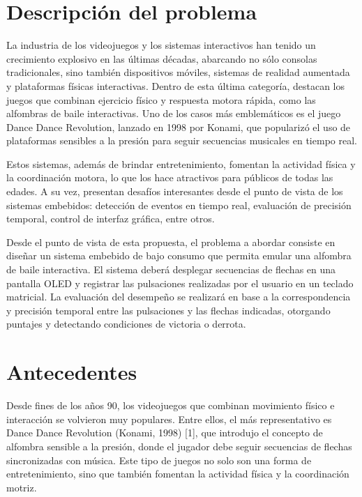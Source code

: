 \documentclass[a4paper,12pt]{article}
\begin{document}
\begin{linenumbers}
  \newpage
  \section{Descripción del problema}
  \label{sec:descripcion}
  La industria de los videojuegos y los sistemas interactivos han tenido un crecimiento explosivo en las últimas décadas, abarcando no sólo consolas tradicionales, sino también dispositivos móviles, sistemas de realidad aumentada y plataformas físicas interactivas. Dentro de esta última categoría, destacan los juegos que combinan ejercicio físico y respuesta motora rápida, como las alfombras de baile interactivas. Uno de los casos más emblemáticos es el juego Dance Dance Revolution, lanzado en 1998 por Konami, que popularizó el uso de plataformas sensibles a la presión para seguir secuencias musicales en tiempo real.

  Estos sistemas, además de brindar entretenimiento, fomentan la actividad física y la coordinación motora, lo que los hace atractivos para públicos de todas las edades. A su vez, presentan desafíos interesantes desde el punto de vista de los sistemas embebidos: detección de eventos en tiempo real, evaluación de precisión temporal, control de interfaz gráfica, entre otros.

  Desde el punto de vista de esta propuesta, el problema a abordar consiste en diseñar un sistema embebido de bajo consumo que permita emular una alfombra de baile interactiva. El sistema deberá desplegar secuencias de flechas en una pantalla OLED y registrar las pulsaciones realizadas por el usuario en un teclado matricial. La evaluación del desempeño se realizará en base a la correspondencia y precisión temporal entre las pulsaciones y las flechas indicadas, otorgando puntajes y detectando condiciones de victoria o derrota.
  
  \section{Antecedentes}
  \label{sec:Antecedentes}
  
  Desde fines de los años 90, los videojuegos que combinan movimiento físico e interacción se volvieron muy populares. Entre ellos, el más representativo es Dance Dance Revolution (Konami, 1998) [1], que introdujo el concepto de alfombra sensible a la presión, donde el jugador debe seguir secuencias de flechas sincronizadas con música. Este tipo de juegos no solo son una forma de entretenimiento, sino que también fomentan la actividad física y la coordinación motriz.


\end{linenumbers}
\end{document}
